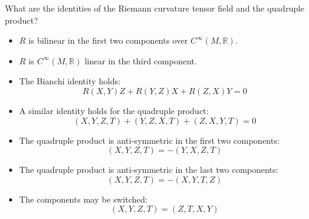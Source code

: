 \documentclass{beamer}
\begin{document}
    \begin{frame}
        What are the identities of the Riemann curvature tensor field and the
        quadruple product?
        \begin{itemize}
            \item $R$ is bilinear in the first two components over
                $C^{\infty}(M,\mathbb{R})$.
            \item $R$ is $C^{\infty}(M,\mathbb{R})$ linear in the third component.
            \item The Bianchi identity holds:
                \begin{equation}
                    R(X,Y)Z+R(Y,Z)X+R(Z,X)Y=0
                \end{equation}
            \item A similar identity holds for the quadruple product:
            \begin{equation}
                (X,Y,Z,T)+(Y,Z,X,T)+(Z,X,Y,T)=0
            \end{equation}
            \item The quadruple product is anti-symmetric in the first two
                components:
                \begin{equation}
                    (X,Y,Z,T)=-(Y,X,Z,T)
                \end{equation}
            \item The quadruple product is anti-symmetric in the last two
                components:
                \begin{equation}
                    (X,Y,Z,T)=-(X,Y,T,Z)
                \end{equation}
            \item The components may be switched:
                \begin{equation}
                    (X,Y,Z,T)=(Z,T,X,Y)
                \end{equation}
        \end{itemize}
    \end{frame}
\end{document}

